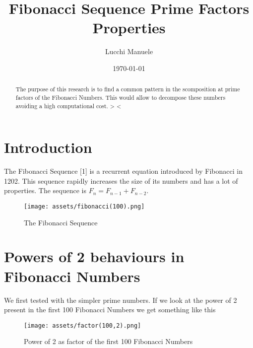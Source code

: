 \documentclass[amsmath,amssymb,aps,pra,reprint,groupedaddress,showpacs]{revtex4-1}
\begin{document}
 

\title{Fibonacci Sequence Prime Factors Properties}
 
\author{Lucchi Manuele}

\date{\today}

\begin{abstract}
The purpose of this research is to find a common pattern in the scomposition at prime factors of the Fibonacci Numbers. 
This would allow to decompose these numbers avoiding a high computational cost. > <
\end{abstract} 
 
\maketitle

\section{Introduction}

The Fibonacci Sequence [1] is a recurrent equation introduced by Fibonacci in 1202. This sequence rapidly increases the size of its numbers and has a lot of properties.
The sequence is $F_n = F_{n-1} + F_{n-2}$. %

\begin{figure}[H]
\centering
\texttt{[image: assets/fibonacci(100).png]}
\caption{The Fibonacci Sequence}
\end{figure} 

\section{Powers of 2 behaviours in Fibonacci Numbers}

We first tested with the simpler prime numbers. If we look at the power of 2 present in the first 100 Fibonacci Numbers we get something like this

\begin{figure}[H]
\centering
\texttt{[image: assets/factor(100,2).png]} %
\caption{Power of 2 as factor of the first 100 Fibonacci Numbers}
\end{figure}
\end{document}

